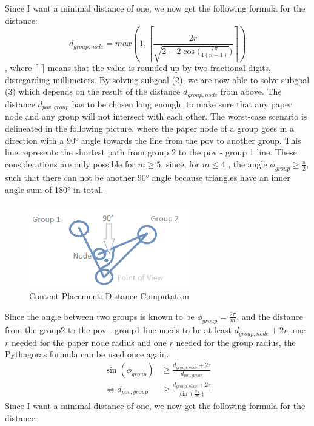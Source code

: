 \documentclass[12pt,a4paper,oneside,american,parskip=half]{article}
\begin{document}
\begin{justify}
\begin{normalsize}
Since I want a minimal distance of one, we now get the following formula for the distance:
\begin{equation}
d_{group, node} = max \left(1, \left\lceil \frac{2r}{\sqrt{2 - 2\cos\big(\frac{7\pi}{4(n - 1)}}\big)} \right\rceil \right)
\end{equation}
, where $\lceil$  $\rceil$ means that the value is rounded up by two fractional digits, disregarding millimeters.
\newline
By solving subgoal (2), we are now able to solve subgoal (3) which depends on the result of the distance $d_{group, node}$ from above. The distance  $d_{pov, group}$ has to be chosen long enough, to make sure that any paper node and any group will not intersect with each other.
\newline
The worst-case scenario is delineated in the following picture, where the paper node of a group goes in a direction with a 90° angle towards the line from the pov to another group. This line represents the shortest path from group 2 to the pov - group 1 line. These considerations are only possible for $m \geq 5$, since, for $m \leq 4$ , the angle $\phi_{group} \geq \frac{\pi}{2}$, such that there can not be another 90° angle because triangles have an inner angle sum of 180° in total.
%
%
\begin{figure}[h!]
\centering
\includegraphics[width=7cm]{angle2.png}
\caption{Content Placement: Distance Computation}
\end{figure}
\newline
Since the angle between two groups is known to be $\phi_{group} = \frac{2\pi}{m}$, and the distance from the group2 to the pov - group1 line needs to be at least $d_{group, node} + 2r$, one $r$ needed for the paper node radius and one $r$ needed for the group radius, the Pythagoras formula can be used once again.
\begin{align*}
\sin(\phi_{group}) &\geq \frac{d_{group, node} + 2r}{d_{pov, group}} \\
\Leftrightarrow d_{pov, group} &\geq \frac{d_{group, node} + 2r}{\sin(\frac{2\pi}{m})}
\end{align*}
Since I want a minimal distance of one, we now get the following formula for the distance:

\end{normalsize}
\end{justify}
\end{document}
